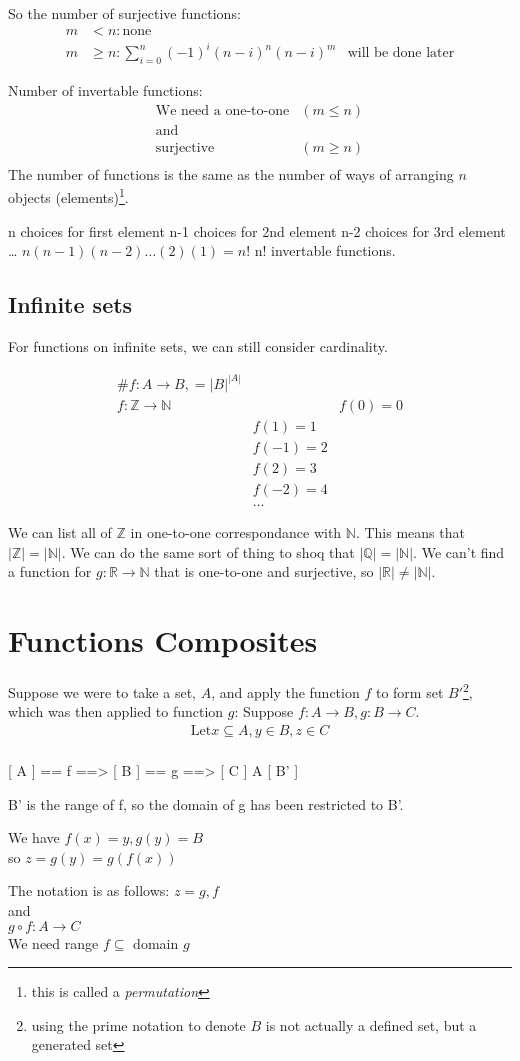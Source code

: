 So the number of surjective functions:
\begin{align}
  m & < n: \text{none} & \\
  m & \geq n: \sum_{i=0}^{n}(-1)^{i}(n-i)^{n}(n-i)^{m} & \text{will be done later}
\end{align}

Number of invertable functions:
\begin{align}
  \text{We need a one-to-one} & (m \leq n )\\
  \text{and} & \nonumber \\
  \text{surjective} & (m \geq n) \\
\end{align}
The number of functions is the same as the number of ways of arranging $n$ objects
(elements)\footnote{this is called a \emph{permutation}}.

n choices for first element
n-1 choices for 2nd element
n-2 choices for 3rd element
\ldots
$n(n-1)(n-2)\ldots(2)(1) = n!$
n! invertable functions.

\subsection{Infinite sets}
For functions on infinite sets, we can still consider cardinality.

\begin{align}
  \# f: A \to B, = |B|^{|A|} \\
  f: \mathbb{Z} \to \mathbb{N} &
   & f(0) = 0 \\
   & f(1) = 1 \\
   & f(-1) = 2 \\
   & f(2) = 3 \\
   & f(-2) = 4 \\
   & \ldots
\end{align}

We can list all of $\mathbb{Z}$ in one-to-one correspondance with $\mathbb{N}$.
This means that $|\mathbb{Z}| = |\mathbb{N}|$. We can do the same sort of thing
to shoq that $|\mathbb{Q}| = |\mathbb{N}|$. We can't find a function for
$g: \mathbb{R} \to \mathbb{N}$ that is one-to-one and surjective, so
$|\mathbb{R}| \neq |\mathbb{N}|$.

\section{Functions Composites}
Suppose we were to take a set, $A$, and apply the function $f$ to form
set $B'$\footnote{using the prime notation to denote $B$ is not actually a
defined set, but a generated set}, which was then applied to function $g$:
Suppose $f: A \to B, g: B \to C$. \\
\begin{align}
  \text{Let} x \subseteq A, y \in B, z \in C \\
\end{align}

[ A ] == f ==> [ B  ] == g ==> [ C ]
  A            [ B' ]

B' is the range of f, so the domain of g has been restricted to B'.

We have $f(x) = y, g(y) = B$ \\
so $z = g(y) = g(f(x))$

The notation is as follows:  $z = g,f$ \\
and \\
$g \circ f: A \to C$ \\
We need range $f \subseteq$ domain $g$